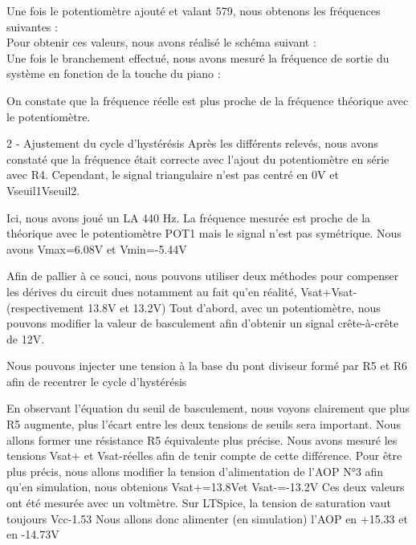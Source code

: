 Une fois le potentiomètre ajouté et valant 579, nous obtenons les fréquences suivantes :\\

Pour obtenir ces valeurs, nous avons réalisé le schéma suivant :\\

Une fois le branchement effectué, nous avons mesuré la fréquence de sortie du système en fonction de la touche du piano :

On constate que la fréquence réelle est plus proche de la fréquence théorique avec le potentiomètre.













2 - Ajustement du cycle d’hystérésis
Après les différents relevés, nous avons constaté que la fréquence était correcte avec l’ajout du potentiomètre en série avec R4. Cependant, le signal triangulaire n’est pas centré en 0V 
et Vseuil1Vseuil2.


Ici, nous avons joué un LA 440 Hz. La fréquence mesurée est proche de la théorique avec le potentiomètre POT1 mais le signal n’est pas symétrique. Nous avons 
Vmax=6.08V et
Vmin=-5.44V











Afin de pallier à ce souci, nous pouvons utiliser deux méthodes pour compenser les dérives du circuit dues notamment au fait qu’en réalité, Vsat+Vsat- (respectivement 13.8V et 13.2V)
Tout d’abord, avec un potentiomètre, nous pouvons modifier la valeur de basculement afin d’obtenir un signal crête-à-crête de 12V.

Nous pouvons injecter une tension à la base du pont diviseur formé par R5 et R6 afin de recentrer le cycle d’hystérésis

En observant l’équation du seuil de basculement, nous voyons clairement que plus R5 augmente, plus l'écart entre les deux tensions de seuils sera important.
Nous allons former une résistance R5 équivalente plus précise.
Nous avons mesuré les tensions Vsat+ et Vsat-réelles afin de tenir compte de cette différence. 
Pour être plus précis, nous allons modifier la tension d’alimentation de l’AOP N°3 afin qu’en simulation, nous obtenions Vsat+=13.8Vet Vsat-=-13.2V
Ces deux valeurs ont été mesurée avec un voltmètre.
Sur LTSpice, la tension de saturation vaut toujours Vcc-1.53
Nous allons donc alimenter (en simulation) l’AOP en +15.33 et en -14.73V

